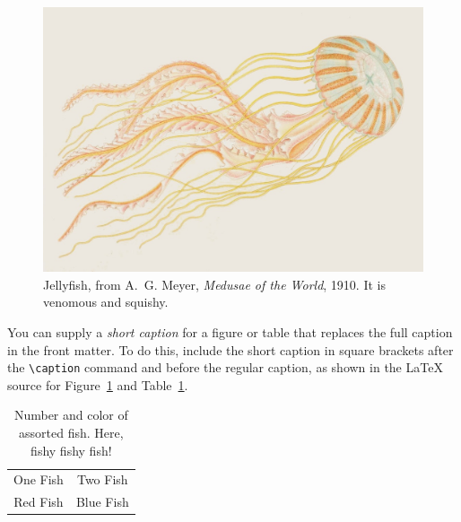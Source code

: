 
\begin{figure}
    \centering
    \includegraphics[width=0.6 \textwidth] {jellyfish}
    \caption[A Picture of a Jellyfish]{Jellyfish, from A.~G. Meyer, \textit{Medusae of the World}, 1910. It is venomous and squishy.}
    \label{fig:jelly}
\end{figure}

You can supply a \emph{short caption} for a figure or table that replaces the full caption in the front matter.  To do this, include the short caption in square brackets after the \texttt{\textbackslash caption} command and before the regular caption, as shown in the LaTeX source for Figure~\ref{fig:jelly} and Table~\ref{tab:fish}.

\begin{table}[b]
\centering
    \caption[A Table of Fish]{Number and color of assorted fish.  Here, fishy fishy fish!}
    \label{tab:fish}
    \begin{tabular}{|c|c|}
    \hline
         One Fish & Two Fish  \\
         Red Fish & Blue Fish \\
    \hline
    \end{tabular}
\end{table}

